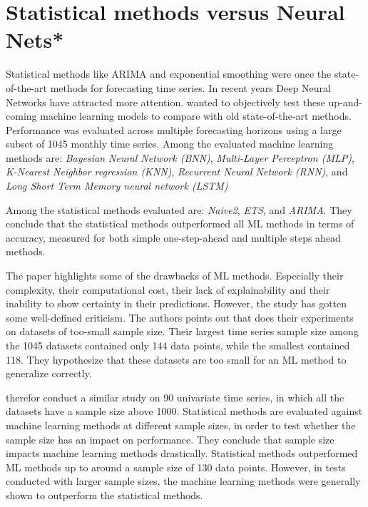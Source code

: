 \section{Statistical methods versus Neural Nets*}
\label{section:RelatedWork:Statistical-NN}

Statistical methods like ARIMA and exponential smoothing were once the state-of-the-art methods for forecasting time series.
In recent years Deep Neural Networks have attracted more attention.
\cite{Makridakis2018} wanted to objectively test these up-and-coming machine learning models to compare with old state-of-the-art methods.
Performance was evaluated across multiple forecasting horizons using a large subset of 1045 monthly time series.
Among the evaluated machine learning methods are:
\textit{Bayesian Neural Network (BNN)},
\textit{Multi-Layer Perceptron (MLP)},
\textit{K-Nearest Neighbor regression (KNN)},
\textit{Recurrent Neural Network (RNN)}, and
\textit{Long Short Term Memory neural network (LSTM)}


Among the statistical methods evaluated are:
\textit{Naive2},
\textit{ETS}, and
\textit{ARIMA}.
They conclude that the statistical methods outperformed all ML methods in terms of accuracy, measured for both
simple one-step-ahead and multiple steps ahead methods.

The paper \cite{Makridakis2018} highlights some of the drawbacks of ML methods. Especially their complexity, their computational cost,
their lack of explainability and their inability to show certainty in their predictions.
However, the study has gotten some well-defined criticism. The authors \citeauthor*{Cerqueira2019} points
out that \cite{Makridakis2018} does their experiments on datasets of too-small sample size.
Their largest time series sample size among the 1045 datasets contained only 144 data points, while the smallest contained 118.
They hypothesize that these datasets are too small for an ML method to generalize correctly.

\cite{Cerqueira2019} therefor conduct a similar study on 90 univariate time series, in which
all the datasets have a sample size above 1000.
Statistical methods are evaluated against machine learning methods at different sample sizes,
in order to test whether the sample size has an impact on performance.
They conclude that sample size impacts machine learning methods drastically.
Statistical methods outperformed ML methods up to around a sample size of 130 data points.
However, in tests conducted with larger sample sizes, the machine learning methods were generally shown to outperform the statistical methods.

